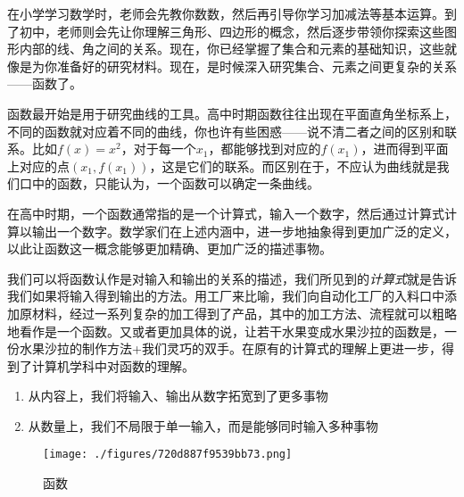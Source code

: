 

\begin{issues}
\issueDraft
\issueTODO
\end{issues}


在小学学习数学时，老师会先教你数数，然后再引导你学习加减法等基本运算。到了初中，老师则会先让你理解三角形、四边形的概念，然后逐步带领你探索这些图形内部的线、角之间的关系。现在，你已经掌握了集合和元素的基础知识，这些就像是为你准备好的研究材料。现在，是时候深入研究集合、元素之间更复杂的关系——函数了。




函数最开始是用于研究曲线的工具。高中时期函数往往出现在平面直角坐标系上，不同的函数就对应着不同的曲线，你也许有些困惑——说不清二者之间的区别和联系。比如$f(x)=x^2$，对于每一个$x_1$，都能够找到对应的$f(x_1)$，进而得到平面上对应的点$(x_1,f(x_1))$，这是它们的联系。而区别在于，不应认为曲线就是我们口中的函数，只能认为，一个函数可以确定一条曲线。

在高中时期，一个函数通常指的是一个计算式，输入一个数字，然后通过计算式计算以输出一个数字。数学家们在上述内涵中，进一步地抽象得到更加广泛的定义，以此让函数这一概念能够更加精确、更加广泛的描述事物。

我们可以将函数认作是对输入和输出的关系的描述，我们所见到的\textsl{计算式}就是告诉我们如果将输入得到输出的方法。用工厂来比喻，我们向自动化工厂的入料口中添加原材料，经过一系列复杂的加工得到了产品，其中的加工方法、流程就可以粗略地看作是一个函数。又或者更加具体的说，让若干水果变成水果沙拉的函数是，一份水果沙拉的制作方法+我们灵巧的双手。在原有的计算式的理解上更进一步，得到了计算机学科中对函数的理解。
\begin{enumerate}
\item 从内容上，我们将输入、输出从数字拓宽到了更多事物
\item 从数量上，我们不局限于单一输入，而是能够同时输入多种事物
\end{enumerate}


\begin{figure}[ht]
\centering
\texttt{[image: ./figures/720d887f9539bb73.png]}
\caption{函数} \label{fig_functi_1}
\end{figure}

